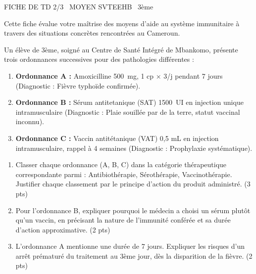 \documentclass[11pt]{article}
\begin{document}
\begin{tcolorbox}[enhanced,colback=popink,colframe=popink,arc=10pt,boxrule=0pt,left=12pt,right=12pt,top=9pt,bottom=9pt]
{\color{white}\popxbold\small FICHE DE TD 2/3 \textbullet\ MOYEN \hfill SVTEEHB \textbullet\ 3ème\par}
\end{tcolorbox}
\vspace{4pt}
Cette fiche évalue votre maîtrise des moyens d'aide au système immunitaire à travers des situations concrètes rencontrées au Cameroun.

\begin{exercice}
Un élève de 3ème, soigné au Centre de Santé Intégré de Mbankomo, présente trois ordonnances successives pour des pathologies différentes : 
\begin{enumerate}
    \item \textbf{Ordonnance A :} Amoxicilline \SI{500}{\milli\gram}, 1 cp × 3/j pendant 7 jours (Diagnostic : Fièvre typhoïde confirmée).
    \item \textbf{Ordonnance B :} Sérum antitetanique (SAT) \SI{1500}{UI} en injection unique intramusculaire (Diagnostic : Plaie souillée par de la terre, statut vaccinal inconnu).
    \item \textbf{Ordonnance C :} Vaccin antitétanique (VAT) 0,5 mL en injection intramusculaire, rappel à 4 semaines (Diagnostic : Prophylaxie systématique).
\end{enumerate}
\begin{enumerate}
    \item Classer chaque ordonnance (A, B, C) dans la catégorie thérapeutique correspondante parmi : Antibiothérapie, Sérothérapie, Vaccinothérapie. Justifier chaque classement par le principe d'action du produit administré. (3 pts)
    \item Pour l'ordonnance B, expliquer pourquoi le médecin a choisi un sérum plutôt qu'un vaccin, en précisant la nature de l'immunité conférée et sa durée d'action approximative. (2 pts)
    \item L'ordonnance A mentionne une durée de 7 jours. Expliquer les risques d'un arrêt prématuré du traitement au 3ème jour, dès la disparition de la fièvre. (2 pts)
\end{enumerate}
\end{exercice}
\end{document}
